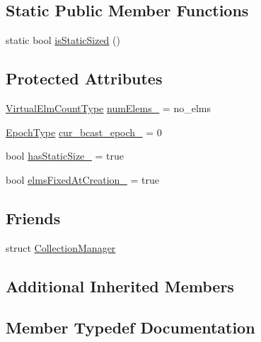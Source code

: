 \subsection*{Static Public Member Functions}
\begin{DoxyCompactItemize}
\item 
static bool \hyperlink{structvt_1_1vrt_1_1collection_1_1_collection_base_ae7cd5989684f0407b54c9886c79efc5f}{is\+Static\+Sized} ()
\end{DoxyCompactItemize}
\subsection*{Protected Attributes}
\begin{DoxyCompactItemize}
\item 
\hyperlink{namespacevt_ac115668758184050beff7a9281a2c490}{Virtual\+Elm\+Count\+Type} \hyperlink{structvt_1_1vrt_1_1collection_1_1_collection_base_a51c5c2114bb9b849878e384c25c4497b}{num\+Elems\+\_\+} = no\+\_\+elms
\item 
\hyperlink{namespacevt_a985a5adf291c34a3ca263b3378388236}{Epoch\+Type} \hyperlink{structvt_1_1vrt_1_1collection_1_1_collection_base_a5f4feabd19ea4a986ee9da06bd7aeae0}{cur\+\_\+bcast\+\_\+epoch\+\_\+} = 0
\item 
bool \hyperlink{structvt_1_1vrt_1_1collection_1_1_collection_base_a0894dcc0522db61d302b14d9d28bffdf}{has\+Static\+Size\+\_\+} = true
\item 
bool \hyperlink{structvt_1_1vrt_1_1collection_1_1_collection_base_a190e044fe11ef42d34d0af49c78e49ca}{elms\+Fixed\+At\+Creation\+\_\+} = true
\end{DoxyCompactItemize}
\subsection*{Friends}
\begin{DoxyCompactItemize}
\item 
struct \hyperlink{structvt_1_1vrt_1_1collection_1_1_collection_base_af9288b1963f434a90b307b5305a49510}{Collection\+Manager}
\end{DoxyCompactItemize}
\subsection*{Additional Inherited Members}


\subsection{Member Typedef Documentation}
\mbox{\label{structvt_1_1vrt_1_1collection_1_1_collection_base_af40b40a2ee128748bcb917f14a0152b4}} 
